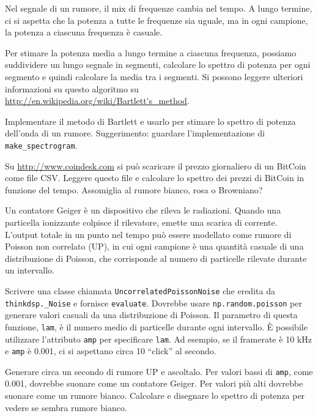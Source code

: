 \documentclass[12pt]{book} \usepackage[width=5.5in,height=8.5in, hmarginratio=3:2,vmarginratio=1:1]{geometry}
\begin{document}
\begin{exercise} Nel segnale di un rumore, il mix di frequenze cambia nel tempo. A lungo termine, ci si aspetta che la potenza a tutte le frequenze sia uguale, ma in ogni campione, la potenza a ciascuna frequenza è casuale.

Per stimare la potenza media a lungo termine a ciascuna frequenza, possiamo suddividere un lungo segnale in segmenti, calcolare lo spettro di potenza per ogni segmento e quindi calcolare la media tra i segmenti. Si possono leggere ulteriori informazioni su questo algoritmo su \url{http://en.wikipedia.org/wiki/Bartlett's_method}.

Implementare il metodo di Bartlett e usarlo per stimare lo spettro di potenza dell'onda di un rumore. Suggerimento: guardare l'implementazione di \verb"make_spectrogram". \end{exercise} 

\begin{exercise} Su \url{http://www.coindesk.com} si può scaricare il prezzo giornaliero di un BitCoin come file CSV. Leggere questo file e calcolare lo spettro dei prezzi di BitCoin in funzione del tempo. Assomiglia al rumore bianco, rosa o Browniano? \end{exercise} 

\begin{exercise} Un contatore Geiger è un dispositivo che rileva le radiazioni. Quando una particella ionizzante colpisce il rilevatore, emette una scarica di corrente. L'output totale in un punto nel tempo può essere modellato come rumore di Poisson non correlato (UP), in cui ogni campione è una quantità casuale di una distribuzione di Poisson, che corrisponde al numero di particelle rilevate durante un intervallo.

Scrivere una classe chiamata {\tt UncorrelatedPoissonNoise} che eredita da \verb"thinkdsp._Noise" e fornisce {\tt evaluate}. Dovrebbe usare {\tt np.random.poisson} per generare valori casuali da una distribuzione di Poisson. Il parametro di questa funzione, {\tt lam}, è il numero medio di particelle durante ogni intervallo. È possibile utilizzare l'attributo {\tt amp} per specificare {\tt lam}. Ad esempio, se il framerate è 10 kHz e {\tt amp} è 0.001, ci si aspettano circa 10 ``click'' al secondo.

Generare circa un secondo di rumore UP e ascoltalo. Per valori bassi di {\tt amp}, come 0.001, dovrebbe suonare come un contatore Geiger. Per valori più alti dovrebbe suonare come un rumore bianco. Calcolare e disegnare lo spettro di potenza per vedere se sembra rumore bianco. \end{exercise} 
\end{document}
